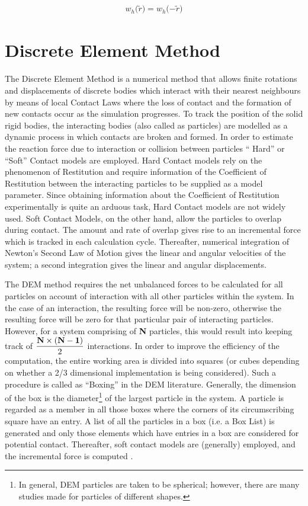  \begin{eqnarray}\label{eq:kernel-symmetry}
  \textit{w$_h(\widetilde{r}$)} = \textit{w$_h(-\widetilde{r}$)}
 \end{eqnarray}

\section{Discrete Element Method}

The Discrete Element Method is a numerical method that allows finite rotations and displacements of discrete bodies which interact with their nearest neighbours by means of local Contact Laws where the loss of contact and the formation of new contacts occur as the simulation progresses. To track the position of the solid rigid bodies, the interacting bodies (also called as particles) are modelled as a dynamic process in which contacts are broken and formed. In order to estimate the reaction force due to interaction or collision between particles `` Hard'' or ``Soft'' Contact models are employed. Hard Contact models rely on the phenomenon of Restitution and require information of the Coefficient of Restitution between the interacting particles to be supplied as a model parameter. Since obtaining information about the Coefficient of Restitution experimentally is quite an arduous task, Hard Contact models are not widely used. Soft Contact Models, on the other hand, allow the particles to overlap during contact. The amount and rate of overlap gives rise to an incremental force which is tracked in each calculation cycle. Thereafter, numerical integration of Newton's Second Law of Motion gives the linear and angular velocities of the system; a second integration gives the linear and angular displacements.

The DEM method requires the net unbalanced forces to be calculated for all particles on account of interaction with all other particles within the system. In the case of an interaction, the resulting force will be non-zero, otherwise the resulting force will be zero for that particular pair of interacting particles. However, for a system comprising of \textbf{N} particles, this would result into keeping track of $\dfrac{{\bf{N}} \times {\bf{(N-1)}}}{2}$ interactions. In order to improve the efficiency of the computation, the entire working area is divided into squares (or cubes depending on whether a 2/3 dimensional implementation is being considered). Such a procedure is called as ``Boxing'' in the DEM literature. Generally, the dimension of the box is the diameter\footnote{In general, DEM particles are taken to be spherical; however, there are many studies made for particles of different shapes.} of the largest particle in the system. A particle is regarded as a member in all those boxes where the corners of its circumscribing square have an entry.  A list of all the particles in a box (i.e. a Box List) is generated and only those elements which have entries in a box are considered for potential contact. Thereafter, soft contact models are (generally) employed, and the incremental force is computed \cite{mishra}.